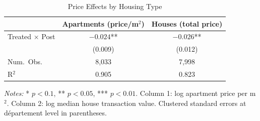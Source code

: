 \begin{table}[htbp]
\centering
\caption{Price Effects by Housing Type}
\label{tab:housing}
\begin{tabular}{lcc}
\toprule
& Apartments (price/m$^2$) & Houses (total price) \\
\midrule
Treated $\times$ Post & $-0.024$** & $-0.026$** \\
& (0.009) & (0.012) \\
\midrule
Num.\ Obs. & 8,033 & 7,998 \\
R$^2$ & 0.905 & 0.823 \\
\bottomrule
\end{tabular}
\par\smallskip\noindent\small\textit{Notes:} * $p < 0.1$, ** $p < 0.05$, *** $p < 0.01$. Column 1: log apartment price per m$^2$. Column 2: log median house transaction value. Clustered standard errors at d\'{e}partement level in parentheses.
\end{table}
